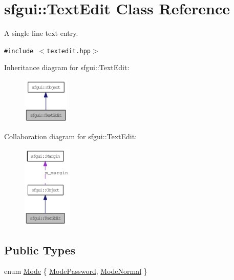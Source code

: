 \hypertarget{classsfgui_1_1TextEdit}{
\section{sfgui::TextEdit Class Reference}
\label{classsfgui_1_1TextEdit}
}
A single line text entry.  


{\tt \#include $<$textedit.hpp$>$}

Inheritance diagram for sfgui::TextEdit:\nopagebreak
\begin{figure}[H]
\begin{center}
\leavevmode
\includegraphics[width=62pt]{classsfgui_1_1TextEdit__inherit__graph}
\end{center}
\end{figure}
Collaboration diagram for sfgui::TextEdit:\nopagebreak
\begin{figure}[H]
\begin{center}
\leavevmode
\includegraphics[width=66pt]{classsfgui_1_1TextEdit__coll__graph}
\end{center}
\end{figure}
\subsection*{Public Types}
\begin{CompactItemize}
\item 
enum \hyperlink{classsfgui_1_1TextEdit_f57eb4d7008c723b438197b3d0a12694}{Mode} \{ \hyperlink{classsfgui_1_1TextEdit_f57eb4d7008c723b438197b3d0a126949acf4a0b80bbbc130112983c4d7c7988}{ModePassword}, 
\hyperlink{classsfgui_1_1TextEdit_f57eb4d7008c723b438197b3d0a12694e3840cc3f77909c7d436d3b904d9113a}{ModeNormal}
 \}
\end{CompactItemize}
